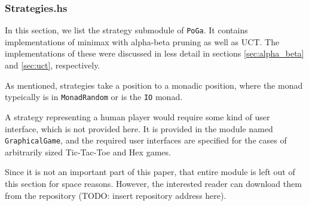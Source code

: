 \subsubsection {Strategies.hs}

In this section, we list the strategy submodule of \texttt{PoGa}.
It contains implementations of minimax with alpha-beta pruning as well as UCT.
The implementations of these were discussed in less detail in sections \ref{sec:alpha_beta} and \ref{sec:uct}, respectively.


As mentioned, strategies take a position to a monadic position, where the monad typeically is in \texttt{MonadRandom} or is the \texttt{IO} monad.

A strategy representing a human player would require some kind of user interface, which is not provided here.
It is provided in the module named \texttt{GraphicalGame}, and the required user interfaces are specified for the cases of arbitrarily sized Tic-Tac-Toe and Hex games.

Since it is not an important part of this paper, that entire module is left out of this section for space reasons.
However, the interested reader can download them from the repository (TODO: insert repository address here).




